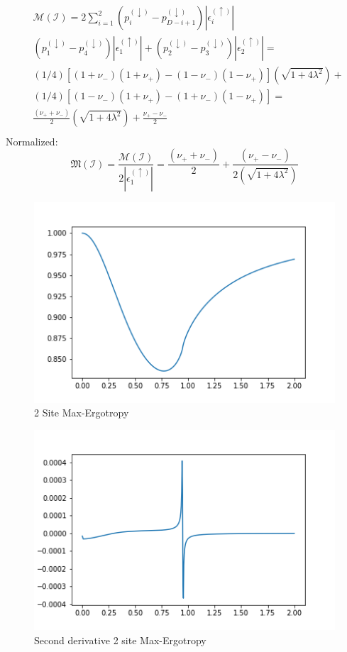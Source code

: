 \documentclass[12pt,a4paper]{report}
\begin{document}
\begin{equation}
	\begin{aligned}
		&
		\mathcal{M}(\mathcal{I})=2 \sum_{i=1}^ {2}\left(p_{i}^{(\downarrow)}-p_{D-i+1}^{(\downarrow)}\right)\left|\epsilon_{i}^{(\uparrow)}\right|	\\
		& \left(p_{1}^{(\downarrow)}-p_{4}^{(\downarrow)}\right)\left|\epsilon_{1}^{(\uparrow)}\right|+\left(p_{2}^{(\downarrow)}-p_{3}^{(\downarrow)}\right)\left|\epsilon_{2}^{(\uparrow)}\right|=\\
		& (1/4)\left[(1+\nu_-)(1+\nu_+)-(1-\nu_-)(1-\nu_+)\right] \left(\sqrt{1+4 \lambda ^2}\right) + \\
		&(1/4)\left[(1-\nu_-)(1+\nu_+)-(1+\nu_-)(1-\nu_+)\right] = \\
		&\frac{(\nu_+ + \nu_-)}{2}\left(\sqrt{1+4 \lambda ^2}\right)+\frac{\nu_+-\nu_-}{2} \\
	\end{aligned}
\end{equation}
Normalized:
\begin{equation}
	\mathfrak{M}(\mathcal{I}) = \frac{\mathcal{M}(\mathcal{I})}{2\left|\epsilon_{1}^{(\uparrow)}\right|} =\frac{(\nu_+ + \nu_-)}{2}+\frac{(\nu_+-\nu_-)} {2\left(\sqrt{1+4 \lambda ^2}\right)}
\end{equation}
\begin{figure}[h]
	\centering
	\includegraphics[width=0.7\linewidth]{2_site_ergo_theo}
	\caption{2 Site Max-Ergotropy}
	\label{fig:2siteergotheo}
\end{figure}
\begin{figure}[h]
	\centering
	\includegraphics[width=0.7\linewidth]{2_site_ergo_theo_secdev}
	\caption{Second derivative 2 site Max-Ergotropy}
	\label{fig:2siteergotheosecdev}
\end{figure}
\clearpage
\end{document}
